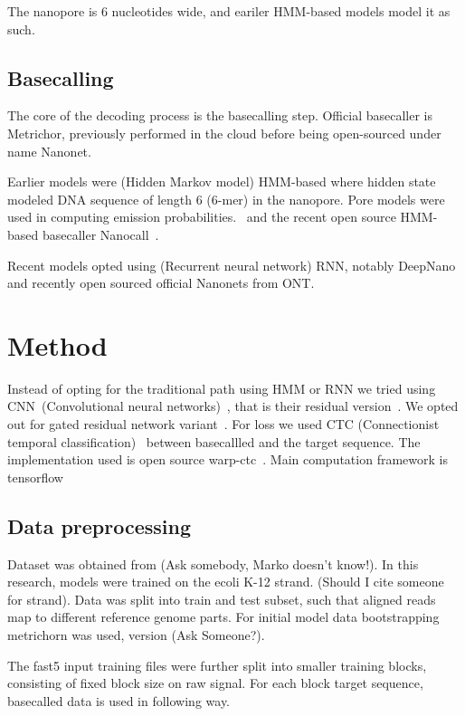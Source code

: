 \documentclass[times, utf8, seminar, numeric]{fer}
\begin{document}
The nanopore is 6 nucleotides wide, and eariler HMM-based models model it as such.

\section{Basecalling}

The core of the decoding process is the basecalling step. Official basecaller is Metrichor, previously performed in the cloud before being open-sourced under name Nanonet.

Earlier models were (Hidden Markov model) HMM-based where hidden state modeled DNA sequence of length 6 (6-mer) in the nanopore. Pore models were used in computing emission probabilities.~\cite{loman2015complete,schreiber2015analysis,szalay2015novo,timp2012dna} and the recent open source HMM-based basecaller Nanocall~\cite{david2016nanocall}.

Recent models opted using (Recurrent neural network) RNN, notably DeepNano~\cite{deepnano} and recently open sourced official Nanonets from ONT.

\chapter{Method}

Instead of opting for the traditional path using HMM or RNN we tried using CNN~(Convolutional neural networks)~\cite{lecun-98}, that is their residual version~\cite{he2016deep}. We opted out for gated residual network variant~\cite{savarese2016learning}. For loss we used CTC (Connectionist temporal classification)~\cite{graves2006connectionist} between basecallled and the target sequence. The implementation used is open source warp-ctc~\cite{warpctc}. Main computation framework is tensorflow~\cite{tensorflow2015-whitepaper}

\section{Data preprocessing}

Dataset was obtained from (Ask somebody, Marko doesn't know!). In this research, models were trained on the ecoli K-12 strand. (Should I cite someone for strand). Data was split into train and test subset, such that aligned reads map to different reference genome parts. For initial model data bootstrapping metrichorn was used, version (Ask Someone?).

The fast5 input training files were further split into smaller training blocks, consisting of fixed block size on raw signal. For each block target sequence, basecalled data is used in following way.
\end{document}
